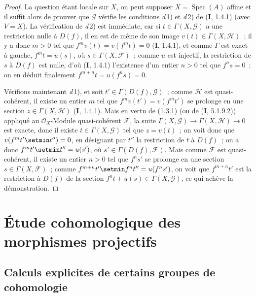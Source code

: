 \begin{proof}
La question étant locale sur $X$, on peut supposer
$X=\operatorname{Spec}(A)$ affine et il suffit alors de prouver que
$\mathcal G$ vérifie les conditions \textit{d}\,1) et \textit{d}\,2) de (\textbf{I}, 1.4.1) (avec
$V=X$). La vérification de \textit{d}\,2) est immédiate, car si
$t\in\Gamma(X,\mathcal G)$ a une restriction nulle à $D(f)$, il en est de
même de son image $v(t)\in\Gamma(X,\mathcal H)$~; il y a donc $m>0$ tel que
$f^mv(t)=v(f^mt)=0$ (\textbf{I}, 1.4.1), et comme $\Gamma$ est exact à gauche,
$f^mt=u(s)$, où $s\in\Gamma(X,\mathcal F)$~; comme $u$ est injectif, la
restriction de $s$ à $D(f)$ est nulle, d'où (\textbf{I}, 1.4.1) l'existence d'un
entier $n>0$ tel que $f^ns=0$~; on en déduit finalement
$f^{m+n}t=u(f^ns)=0$.

Vérifions maintenant \textit{d}\,1), et soit $t'\in\Gamma(D(f),\mathcal G)$~; comme
$\mathcal H$ est quasi-cohérent, il existe un entier $m$ tel que
$f^mv(t')=v(f^mt')$ se prolonge en une section
$z\in\Gamma(X,\mathcal H)$ (\textbf{I}, 1.4.1). Mais en vertu de
(\hyperref[III.1.3.1-fr]{1.3.1}) (ou de (\textbf{I}, 5.1.9.2)) appliqué au
$\mathcal O_X$-Module quasi-cohérent $\mathcal F$, la suite
$\Gamma(X,\mathcal G)\to\Gamma(X,\mathcal H)\to0$ est exacte, donc il existe
$t\in\Gamma(X,\mathcal G)$ tel que $z=v(t)$~; on voit donc que
$v(f^mt'\setmin t'')=0$, en désignant par $t''$ la restriction de $t$ à $D(f)$~;
on a donc $f^mt'\setmin t''=u(s')$, où $s'\in\Gamma(D(f),\mathcal F)$. Mais comme
$\mathcal F$ est quasi-cohérent, il existe un entier $n>0$ tel que $f^ns'$
se prolonge en une section $s\in\Gamma(X,\mathcal F)$~; comme
$f^{m+n}t'\setmin f^nt''=u(f^ns')$, on voit que $f^{m+n}t'$ est la restriction à
$D(f)$ de la section $f^nt+u(s)\in\Gamma(X,\mathcal G)$, ce qui achève
la démonstration.
\end{proof}

\section{Étude cohomologique des morphismes projectifs}
\label{section:III.2-fr}

\subsection{Calculs explicites de certains groupes de cohomologie}
\label{subsection:III.2.1-fr}

